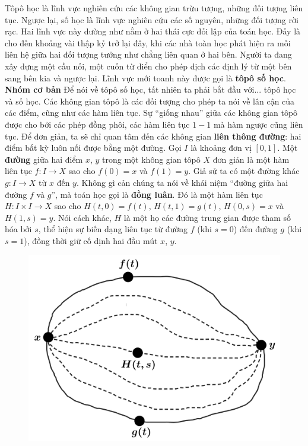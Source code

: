 \begin{multicols}{2}	
	Tôpô học là lĩnh vực nghiên cứu các không gian trừu tượng, những đối tượng liên tục. Ngược lại, số học là lĩnh vực nghiên cứu các số nguyên, những đối tượng rời rạc. Hai lĩnh vực này dường như nằm ở hai thái cực đối lập của toán học. Đấy là cho đến khoảng vài thập kỷ trở lại đây, khi các nhà toàn học phát hiện ra mối liên hệ giữa hai đối tượng tưởng như chẳng liên quan ở hai bên. Người ta đang xây dựng một cầu nối, một cuốn từ điển cho phép dịch các định lý từ một bên sang bên kia và ngược lại. Lĩnh vực mới toanh này được gọi là {\bf\color{duongvaotoanhoc} tôpô số học}.
	\vskip 0.1cm
	\textbf{\color{duongvaotoanhoc}Nhóm cơ bản}
	\vskip 0.1cm
	Để nói về tôpô số học, tất nhiên ta phải bắt đầu với... tôpô học và số học. Các không gian tôpô là các đối tượng cho phép ta nói về lân cận của các điểm, cũng như các hàm liên tục. Sự ``giống nhau'' giữa các không gian tôpô được cho bởi các {phép đồng phôi}, các hàm liên tục $1-1$ mà hàm ngược cũng liên tục. Để đơn giản, ta sẽ chỉ quan tâm đến các không gian {\bf\color{duongvaotoanhoc} liên thông đường}: hai điểm bất kỳ luôn nối được bằng một đường. Gọi $I$ là khoảng đơn vị $[0,1]$. Một {\bf\color{duongvaotoanhoc} đường} giữa hai điểm $x$, $y$ trong một không gian tôpô $X$ đơn giản là một hàm liên tục $f: I \to X$ sao cho $f(0) = x$ và $f(1) = y$.
	\vskip 0.1cm
	Giả sử ta có một đường khác $g: I \to X$ từ $x$ đến $y$. Không gì cản chúng ta nói về khái niệm ``đường giữa hai đường $f$ và $g$'', mà toán học gọi là {\bf\color{duongvaotoanhoc} đồng luân}. Đó là một hàm liên tục $H: I \times I \to X$ sao cho $H(t,0) = f(t)$, $H(t,1) = g(t)$, $H(0,s) = x$ và $H(1,s) = y$. Nói cách khác, $H$ là một họ các đường trung gian được tham số hóa bởi $s$, thể hiện sự biến dạng liên tục từ đường $f$ (khi $s=0$) đến đường $g$ (khi $s = 1$), đồng thời giữ cố dịnh hai đầu mút $x$, $y$. 
	\begin{figure}[H]
		\vspace*{-5pt}
		\centering
		\captionsetup{labelformat= empty, justification=centering}
		\includegraphics[width= 0.9\linewidth]{h1.png}

\end{figure}
\end{multicols}
